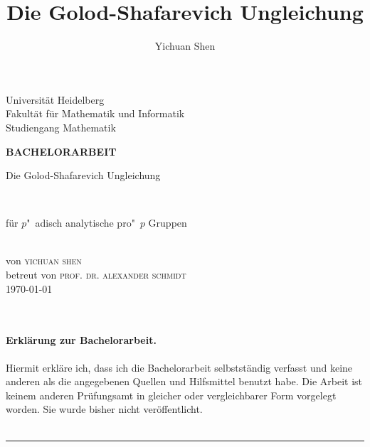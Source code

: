 \documentclass[11pt,a4paper,openany]{memoir}
\author{Yichuan Shen}
\title{Die Golod-Shafarevich Ungleichung}
\begin{document}
\theoremstyle{plain}
\theoremstyle{definition}
\newtheorem{theorem}{Theorem}[chapter]
\newtheorem{lemma}[theorem]{Lemma}
\newtheorem{proposition}[theorem]{Satz}
\newtheorem{corollary}[theorem]{Korollar}
\theoremstyle{definition}
\newtheorem*{definition}{Definition}
\newtheorem*{example}{Beispiel}
\theoremstyle{remark}
\newtheorem*{remark}{Bemerkung}

\frontmatter
{} 

	\begin{center}
	\vspace*{0cm}
	\begin{large}
	Universität Heidelberg\\
	Fakultät für Mathematik und Informatik\\
	Studiengang Mathematik\\
	\vspace{8mm}
	\end{large}
	\vfill 
	\begin{large}
	\textbf{BACHELORARBEIT}\\
	\end{large}
	\vspace{10mm}
	\begin{huge} Die Golod-Shafarevich Ungleichung \end{huge}\\ 
	\vspace{2mm}
	\begin{huge}für $p$"~adisch analytische pro"~$p$ Gruppen \end{huge}\\ 
	\vspace{10mm}
	von \textsc{yichuan shen}\\
	\vspace{3cm}
	\vfill
	betreut von \textsc{prof. dr. alexander schmidt}\\
	\today
	\end{center}

\clearpage
\ 
\clearpage

\vspace*{0cm}
\vfill
\paragraph{Erklärung zur Bachelorarbeit.} Hiermit erkläre ich, dass ich die Bachelorarbeit selbst\-stän\-dig verfasst und keine anderen als die angegebenen Quellen und Hilfsmittel benutzt habe. Die Arbeit ist keinem anderen Prüfungsamt in gleicher oder vergleichbarer Form vorgelegt worden. Sie wurde bisher nicht veröffentlicht.\\
\vspace{7mm}\\
\rule{7cm}{0.4pt}
\clearpage
\end{document}
